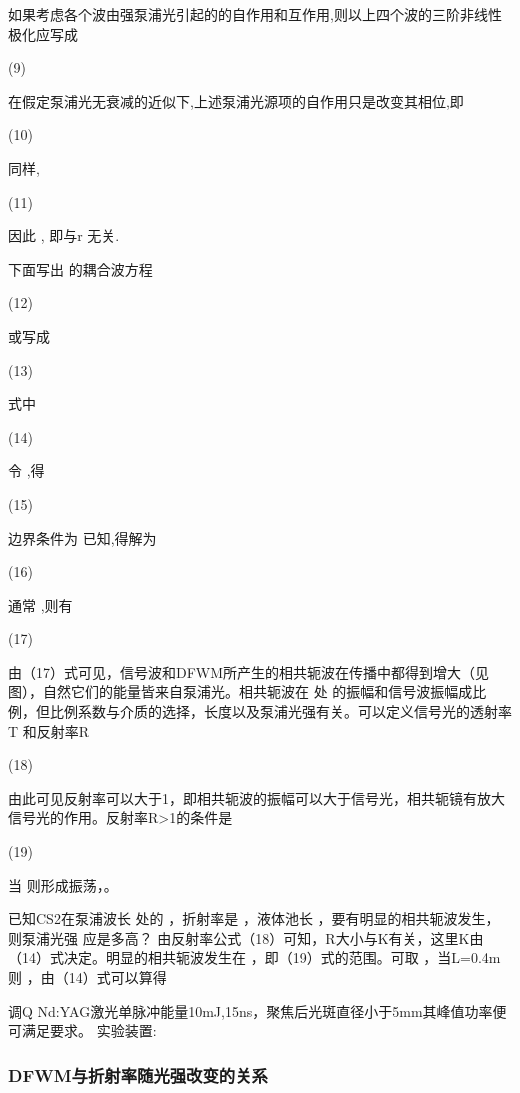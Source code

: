 如果考虑各个波由强泵浦光引起的的自作用和互作用,则以上四个波的三阶非线性极化应写成
                
(9)

在假定泵浦光无衰减的近似下,上述泵浦光源项的自作用只是改变其相位,即

                             (10)                          

同样,


               (11)                         

因此     , 即与r 无关.

下面写出 的耦合波方程

                      (12)

或写成

                                              (13)

式中

              (14)                                 

令   ,得

                                                    (15)

边界条件为 已知,得解为

                           (16)

通常 ,则有

       (17)

由（17）式可见，信号波和DFWM所产生的相共轭波在传播中都得到增大（见图），自然它们的能量皆来自泵浦光。相共轭波在 处 的振幅和信号波振幅成比例，但比例系数与介质的选择，长度以及泵浦光强有关。可以定义信号光的透射率T 和反射率R

         (18)
        
由此可见反射率可以大于1，即相共轭波的振幅可以大于信号光，相共轭镜有放大信号光的作用。反射率R>1的条件是

                                                     (19)

当 则形成振荡，。

\begin{example}
     已知CS2在泵浦波长 处的 ，折射率是 ，液体池长 ，要有明显的相共轭波发生，则泵浦光强 应是多高？
由反射率公式（18）可知，R大小与K有关，这里K由（14）式决定。明显的相共轭波发生在 ，即（19）式的范围。可取 ，当L=0.4m则 ，由（14）式可以算得
    
调Q Nd:YAG激光单脉冲能量10mJ,15ns，聚焦后光斑直径小于5mm其峰值功率便可满足要求。
实验装置:
\end{example}

\subsubsection{DFWM与折射率随光强改变的关系}
    

